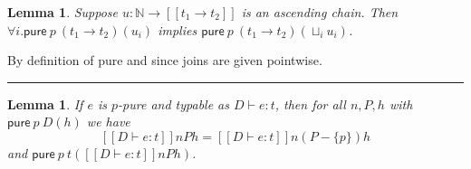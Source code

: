 \documentclass[submission,copyright,creativecommons]{eptcs}
\newcommand{\blackslug}{\rule{7pt}{7pt}}
\newcommand{\ldb}{[\![}
\newcommand{\rdb}{]\!]}
\newcommand{\means}[1]{\ldb {#1}\rdb}
\newcommand{\proves}{\vdash}
\newcommand{\lub}{\sqcup}
\newcommand{\nats}{{\mathbb{N}}}
\newcommand{\pure}{\textsf{pure}}
\newcommand{\D}{D} \newcommand{\ty}{t} \renewcommand{\th}{\theta}
\newcommand{\n}{n} \newcommand{\p}{p} \newcommand{\Ps}{\Pi} \newcommand{\h}{h}
\newtheorem{lemma}[theorem]{Lemma}
\newenvironment{proof}{\begin{trivlist}\item[\hskip\labelsep{\bf
Proof:}]}{\blackslug\end{trivlist}}
\begin{document}
\begin{lemma}
\label{lem:purlub}
Suppose  $u:\nats\to \means{\ty_1\to\ty_2}$ is an ascending chain.
Then $\forall i. \pure~\p~(\ty_1\to \ty_2)(u_i)$ implies 
$\pure~\p~(\ty_1\to \ty_2)(\lub_i u_i)$.
\end{lemma}
\begin{proof}
By definition of pure and since joins are given pointwise.  
\end{proof}

\begin{lemma}
\label{lem:pur}
  If $e$ is $\p$-pure and typable as $\D\proves e:\ty$, then for all $\n,P,\h$
with $\pure~\p~D(\h)$ we have
\[ \means{ D\proves e:\ty} \n P \h =
   \means{ D\proves e:\ty} \n (P-\{\p\}) \h 
\]
and $\pure~\p~\ty(\means{ D\proves e:\ty} \n P \h)$.
\end{lemma}
\end{document}
